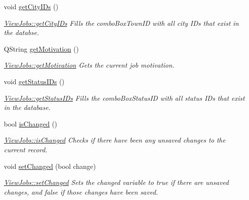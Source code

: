 \begin{DoxyCompactItemize}
\mbox{\label{class_view_jobs_a6cf031afcc4a09dfca54044fdf8c4f7b}} 
void \mbox{\hyperlink{class_view_jobs_a6cf031afcc4a09dfca54044fdf8c4f7b}{get\+City\+I\+Ds}} ()
\begin{DoxyCompactList}\small\item\em \mbox{\hyperlink{class_view_jobs_a6cf031afcc4a09dfca54044fdf8c4f7b}{View\+Jobs\+::get\+City\+I\+Ds}} Fills the combo\+Box\+Town\+ID with all city I\+Ds that exist in the databse. \end{DoxyCompactList}\item 
Q\+String \mbox{\hyperlink{class_view_jobs_a238ec5365ef2c39baa97670769dfedca}{get\+Motivation}} ()
\begin{DoxyCompactList}\small\item\em \mbox{\hyperlink{class_view_jobs_a238ec5365ef2c39baa97670769dfedca}{View\+Jobs\+::get\+Motivation}} Gets the current job motivation. \end{DoxyCompactList}\item 
\mbox{\label{class_view_jobs_adabe196e81c74d17c436de1a6ea12099}} 
void \mbox{\hyperlink{class_view_jobs_adabe196e81c74d17c436de1a6ea12099}{get\+Status\+I\+Ds}} ()
\begin{DoxyCompactList}\small\item\em \mbox{\hyperlink{class_view_jobs_adabe196e81c74d17c436de1a6ea12099}{View\+Jobs\+::get\+Status\+I\+Ds}} Fills the combo\+Box\+Status\+ID with all status I\+Ds that exist in the database. \end{DoxyCompactList}\item 
bool \mbox{\hyperlink{class_view_jobs_a5f75b45d28ce7f4a8050ce9ce0f44350}{is\+Changed}} ()
\begin{DoxyCompactList}\small\item\em \mbox{\hyperlink{class_view_jobs_a5f75b45d28ce7f4a8050ce9ce0f44350}{View\+Jobs\+::is\+Changed}} Checks if there have been any unsaved changes to the current record. \end{DoxyCompactList}\item 
void \mbox{\hyperlink{class_view_jobs_a3cba868c6deadaf4b35c18982f7ec35e}{set\+Changed}} (bool change)
\begin{DoxyCompactList}\small\item\em \mbox{\hyperlink{class_view_jobs_a3cba868c6deadaf4b35c18982f7ec35e}{View\+Jobs\+::set\+Changed}} Sets the changed variable to true if there are unsaved changes, and false if those changes have been saved. \end{DoxyCompactList}\item 

\end{DoxyCompactItemize}
